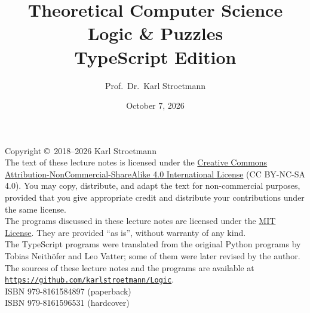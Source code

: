 \documentclass[11pt,twoside]{report}
\title{Theoretical Computer Science \\
       Logic \& Puzzles \\[0.3cm]
       {\large TypeScript Edition}}
\author{Prof.~Dr.~Karl Stroetmann}
\date{October 7, 2026}
\begin{document}
\maketitle
\newpage
\thispagestyle{empty}
\vspace*{\fill}
\noindent
Copyright \copyright\ 2018--2026 Karl Stroetmann
\\[0.3cm]
The text of these lecture notes is licensed under the
\href{https://creativecommons.org/licenses/by-nc-sa/4.0/}{Creative Commons
Attribution-NonCommercial-ShareAlike 4.0 International License} (CC BY-NC-SA 4.0).
You may copy, distribute, and adapt the text for non-commercial purposes, provided that
you give appropriate credit and distribute your contributions under the same license.
\\[0.3cm]
The programs discussed in these lecture notes are licensed under the
\href{https://opensource.org/license/mit}{MIT License}.  They are provided ``as is'',
without warranty of any kind.
\\[0.3cm]
The TypeScript programs were translated from the original Python programs by Tobias Neith\"{o}fer and
Leo Vatter; some of them were later revised by the author.
\\[0.3cm]
The sources of these lecture notes and the programs are available at
\\[0.2cm]
\hspace*{\fill}
\href{https://github.com/karlstroetmann/Logic}{\texttt{https://github.com/karlstroetmann/Logic}}.
\hspace*{\fill}
\\[0.3cm]
ISBN 979-8161584897 (paperback)
\\
ISBN 979-8161596531 (hardcover)
\tableofcontents


\printglossary[type=\acronymtype]

%
%
%


%






\printindex
\end{document}
